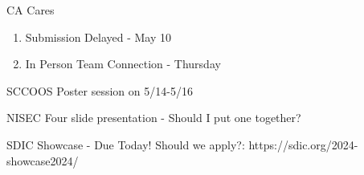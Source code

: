 \begin{frame}{CA Cares}
    \begin{enumerate}
        \item Submission Delayed - May 10
        \item In Person Team Connection - Thursday
    \end{enumerate}
\end{frame}

\begin{frame}{SCCOOS}
    Poster session on 5/14-5/16
\end{frame}

\begin{frame}{NISEC}
    Four slide presentation - Should I put one together?
\end{frame}

\begin{frame}{SDIC Showcase - Due Today!}
    Should we apply?: https://sdic.org/2024-showcase2024/
\end{frame}
